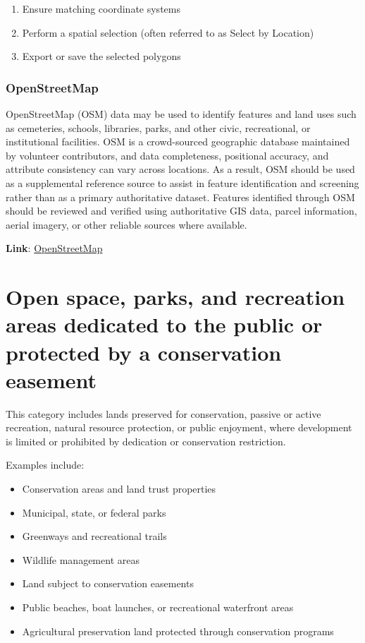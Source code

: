 \documentclass[
  letterpaper,
  DIV=11,
  numbers=noendperiod]{scrreprt}
\providecommand{\tightlist}{%
  \setlength{\itemsep}{0pt}\setlength{\parskip}{0pt}}
\begin{document}
\begin{enumerate}
\def\labelenumi{\arabic{enumi}.}
\tightlist
\item
  Ensure matching coordinate systems
\item
  Perform a spatial selection (often referred to as Select by Location)
\item
  Export or save the selected polygons
\end{enumerate}

\subsubsection{OpenStreetMap}\label{sec-openstreetmap}

OpenStreetMap (OSM) data may be used to identify features and land uses
such as cemeteries, schools, libraries, parks, and other civic,
recreational, or institutional facilities. OSM is a crowd-sourced
geographic database maintained by volunteer contributors, and data
completeness, positional accuracy, and attribute consistency can vary
across locations. As a result, OSM should be used as a supplemental
reference source to assist in feature identification and screening
rather than as a primary authoritative dataset. Features identified
through OSM should be reviewed and verified using authoritative GIS
data, parcel information, aerial imagery, or other reliable sources
where available.

\textbf{Link}: \href{https://www.openstreetmap.org/}{OpenStreetMap}

\section{Open space, parks, and recreation areas dedicated to the public
or protected by a conservation
easement}\label{open-space-parks-and-recreation-areas-dedicated-to-the-public-or-protected-by-a-conservation-easement}

This category includes lands preserved for conservation, passive or
active recreation, natural resource protection, or public enjoyment,
where development is limited or prohibited by dedication or conservation
restriction.

Examples include:

\begin{itemize}
\tightlist
\item
  Conservation areas and land trust properties
\item
  Municipal, state, or federal parks
\item
  Greenways and recreational trails
\item
  Wildlife management areas
\item
  Land subject to conservation easements
\item
  Public beaches, boat launches, or recreational waterfront areas
\item
  Agricultural preservation land protected through conservation programs
\end{itemize}
\end{document}

